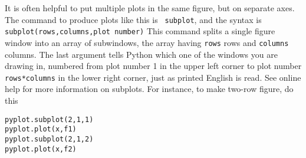 It is often helpful to put multiple plots in the same figure, but
on separate axes. The command to produce plots like this is {\tt
subplot}, and the syntax is \texttt{subplot(rows,columns,plot
number)} This command splits a single figure window into an array
of subwindows, the array having {\tt rows} rows and {\tt columns}
columns. The last argument tells Python which one of the windows
you are drawing in, numbered from plot number 1 in the upper left
corner to plot number {\tt rows*columns} in the lower right corner,
just as printed English is read. See online help for more
information on subplots.  For instance, to make two-row figure, do
this
\begin{Verbatim}
pyplot.subplot(2,1,1)
pyplot.plot(x,f1)
pyplot.subplot(2,1,2)
pyplot.plot(x,f2)
\end{Verbatim}



